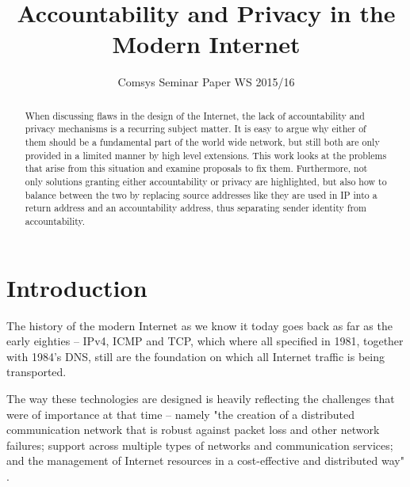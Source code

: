 \documentclass{acm_proc_article-sp}
\begin{document}
\title{Accountability and Privacy in the Modern Internet}
\subtitle{Comsys Seminar Paper WS 2015/16}


\maketitle
\begin{abstract}
When discussing flaws in the design of the Internet, the lack of accountability and privacy mechanisms is a recurring subject matter. It is easy to argue why either of them should be a fundamental part of the world wide network, but still both are only provided in a limited manner by high level extensions. This work looks at the problems that arise from this situation and examine proposals to fix them. Furthermore, not only solutions granting either accountability or privacy are highlighted, but also how to balance between the two by replacing source addresses like they are used in IP into a return address and an accountability address, thus separating sender identity from accountability.
\end{abstract}

\section{Introduction}
The history of the modern Internet as we know it today goes back as far as the early eighties -- IPv4, ICMP and TCP, which where all specified in 1981, together with 1984's DNS, still are the foundation on which all Internet traffic is being transported.

The way these technologies are designed is heavily reflecting the challenges that were of importance at that time -- namely "the creation of a distributed communication network that is robust against packet loss and other network failures; support across multiple types of networks and communication services; and the management of Internet resources in a cost-effective and distributed way" \cite{mot}.
\end{document}
